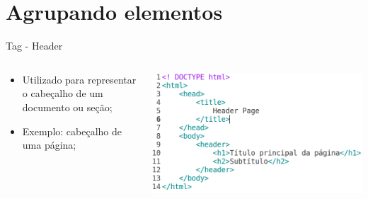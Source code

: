 \documentclass{beamer}
\begin{document}
\section{Agrupando elementos}
\begin{frame}{Tag - Header}
  \begin{columns}
    \begin{column}{0.4 \textwidth}
      \small
      \begin{itemize}
	\item Utilizado para representar o cabeçalho de um documento ou seção;
	 \item Exemplo: cabeçalho de uma página;
      \end{itemize}
    \end{column}
    \begin{column}{0.55\textwidth}
     \includegraphics[height=0.4\paperheight]{fig/aula1/html15.png}
    \end{column}
  \end{columns}
\end{frame}
\end{document}
